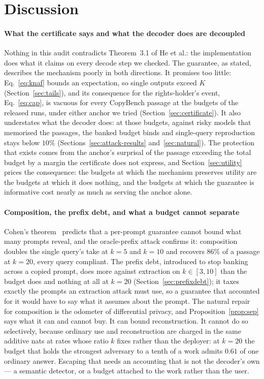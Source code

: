 \section{Discussion}\label{sec:discussion}

\paragraph{What the certificate says and what the decoder does are decoupled}
Nothing in this audit contradicts Theorem~3.1 of He et al.: the implementation does what it claims on every decode step we checked. The guarantee, as stated, describes the mechanism poorly in both directions. It promises too little: Eq.~\eqref{eq:knaf} bounds an expectation, so single outputs exceed $K$ (Section~\ref{sec:tails}), and its consequence for the rights-holder's event, Eq.~\eqref{eq:cap}, is vacuous for every CopyBench passage at the budgets of the released runs, under either anchor we tried (Section~\ref{sec:certificate}). It also understates what the decoder does: at those budgets, against risky models that memorised the passages, the banked budget binds and single-query reproduction stays below $10\%$ (Sections~\ref{sec:attack-results} and~\ref{sec:natural}). The protection that exists comes from the anchor's surprisal of the passage exceeding the total budget by a margin the certificate does not express, and Section~\ref{sec:utility} prices the consequence: the budgets at which the mechanism preserves utility are the budgets at which it does nothing, and the budgets at which the guarantee is informative cost nearly as much as serving the anchor alone.

\paragraph{Composition, the prefix debt, and what a budget cannot separate}
Cohen's theorem~\cite{cohen2025blameless} predicts that a per-prompt guarantee cannot bound what many prompts reveal, and the oracle-prefix attack confirms it: composition doubles the single query's take at $k=5$ and $k=10$ and recovers $86\%$ of a passage at $k=20$, every query compliant. The prefix debt, introduced to stop banking across a copied prompt, does more against extraction on $k \in [3,10]$ than the budget does and nothing at all at $k=20$ (Section~\ref{sec:prefixdebt}); it taxes exactly the prompts an extraction attack must use, so a guarantee that accounted for it would have to say what it assumes about the prompt. The natural repair for composition is the odometer of differential privacy, and Proposition~\ref{prop:sep} says what it can and cannot buy. It can bound reconstruction. It cannot do so selectively, because ordinary use and reconstruction are charged in the same additive nats at rates whose ratio $k$ fixes rather than the deployer: at $k=20$ the budget that holds the strongest adversary to a tenth of a work admits $0.61$ of one ordinary answer. Escaping that needs an accounting that is not the decoder's own --- a semantic detector, or a budget attached to the work rather than the user.

